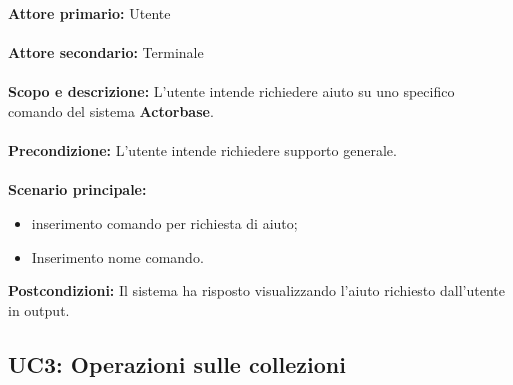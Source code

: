 \documentclass{scalatekids-article}
\begin{document}
\textbf{Attore primario:} Utente\\ \\
\textbf{Attore secondario:} Terminale\\ \\
\textbf{Scopo e descrizione:} L'utente intende richiedere aiuto su uno specifico comando del sistema \textbf{Actorbase}.\\ \\
\textbf{Precondizione:} L'utente intende richiedere supporto generale.\\ \\
\textbf{Scenario principale:}
\begin{itemize}
\item inserimento comando per richiesta di aiuto;
\item Inserimento nome comando.
\end{itemize}
\textbf{Postcondizioni:} Il sistema ha risposto visualizzando l'aiuto richiesto dall'utente in output.

\subsection{UC3: Operazioni sulle collezioni}
\end{document}
